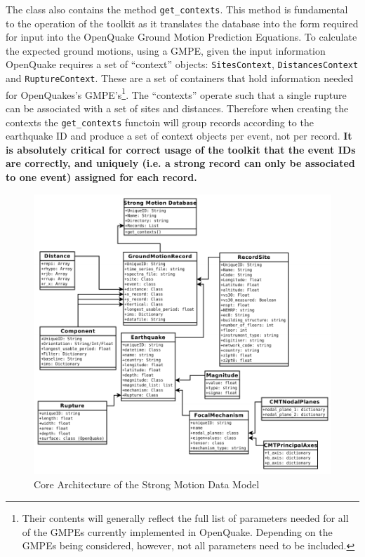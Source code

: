 The class also contains the method \verb=get_contexts=. This method is fundamental to the operation of the toolkit as it translates the database into the form required for input into the OpenQuake Ground Motion Prediction Equations. To calculate the expected ground motions, using a GMPE, given the input information OpenQuake requires a set of ``context'' objects: \verb=SitesContext=, \verb=DistancesContext= and \verb=RuptureContext=. These are a set of containers that hold information needed for OpenQuakes's GMPE's\footnote{Their contents will generally reflect the full list of parameters needed for all of the GMPEs currently implemented in OpenQuake. Depending on the GMPEs being considered, however, not all parameters need to be included.}. The ``contexts'' operate such that a single rupture can be associated with a set of sites and distances. Therefore when creating the contexts the \verb=get_contexts= functoin will group records according to the earthquake ID and produce a set of context objects per event, not per record. \textbf{It is absolutely critical for correct usage of the toolkit that the event IDs are correctly, and uniquely (i.e. a strong record can only be associated to one event) assigned for each record.}

\begin{figure}[htb]
	\centering
		\includegraphics[width=\textwidth]{./figures/database/sm_database_attributes.pdf}
	\caption{Core Architecture of the Strong Motion Data Model}
	\label{fig:sm_data_model}
\end{figure}

